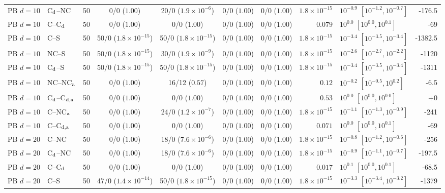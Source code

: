 \begin{tabular}{@{}llr cccc r l r@{}}
PB $d=10$ & C$_{\rm d}$--NC & 50 & 0/0 ($1.00$) & 20/0 ($1.9\times10^{-6}$) & 0/0 ($1.00$) & 0/0 ($1.00$) & $1.8\times10^{-15}$ & $10^{-0.9}$ $[10^{-1.2},10^{-0.7}]$ & -176.5\\
PB $d=10$ & C--C$_{\rm d}$ & 50 & 0/0 ($1.00$) & 0/0 ($1.00$) & 0/0 ($1.00$) & 0/0 ($1.00$) & $0.079$ & $10^{0.0}$ $[10^{0.0},10^{0.1}]$ & -69\\
PB $d=10$ & C--S & 50 & 50/0 ($1.8\times10^{-15}$) & 50/0 ($1.8\times10^{-15}$) & 0/0 ($1.00$) & 0/0 ($1.00$) & $1.8\times10^{-15}$ & $10^{-3.4}$ $[10^{-3.5},10^{-3.4}]$ & -1382.5\\
PB $d=10$ & NC--S & 50 & 50/0 ($1.8\times10^{-15}$) & 30/0 ($1.9\times10^{-9}$) & 0/0 ($1.00$) & 0/0 ($1.00$) & $1.8\times10^{-15}$ & $10^{-2.6}$ $[10^{-2.7},10^{-2.2}]$ & -1120\\
PB $d=10$ & C$_{\rm d}$--S & 50 & 50/0 ($1.8\times10^{-15}$) & 50/0 ($1.8\times10^{-15}$) & 0/0 ($1.00$) & 0/0 ($1.00$) & $1.8\times10^{-15}$ & $10^{-3.4}$ $[10^{-3.5},10^{-3.4}]$ & -1311\\
PB $d=10$ & NC--NC$_{\rm a}$ & 50 & 0/0 ($1.00$) & 16/12 ($0.57$) & 0/0 ($1.00$) & 0/0 ($1.00$) & $0.12$ & $10^{-0.2}$ $[10^{-0.5},10^{0.2}]$ & -6.5\\
PB $d=10$ & C$_{\rm d}$--C$_{\rm d,a}$ & 50 & 0/0 ($1.00$) & 0/0 ($1.00$) & 0/0 ($1.00$) & 0/0 ($1.00$) & $0.53$ & $10^{0.0}$ $[10^{0.0},10^{0.0}]$ & +0\\
PB $d=10$ & C--NC$_{\rm a}$ & 50 & 0/0 ($1.00$) & 24/0 ($1.2\times10^{-7}$) & 0/0 ($1.00$) & 0/0 ($1.00$) & $1.8\times10^{-15}$ & $10^{-1.1}$ $[10^{-1.3},10^{-0.9}]$ & -241\\
PB $d=10$ & C--C$_{\rm d,a}$ & 50 & 0/0 ($1.00$) & 0/0 ($1.00$) & 0/0 ($1.00$) & 0/0 ($1.00$) & $0.071$ & $10^{0.0}$ $[10^{0.0},10^{0.1}]$ & -69\\
PB $d=20$ & C--NC & 50 & 0/0 ($1.00$) & 18/0 ($7.6\times10^{-6}$) & 0/0 ($1.00$) & 0/0 ($1.00$) & $1.8\times10^{-15}$ & $10^{-0.8}$ $[10^{-1.2},10^{-0.6}]$ & -256\\
PB $d=20$ & C$_{\rm d}$--NC & 50 & 0/0 ($1.00$) & 18/0 ($7.6\times10^{-6}$) & 0/0 ($1.00$) & 0/0 ($1.00$) & $1.8\times10^{-15}$ & $10^{-0.9}$ $[10^{-1.1},10^{-0.7}]$ & -197.5\\
PB $d=20$ & C--C$_{\rm d}$ & 50 & 0/0 ($1.00$) & 0/0 ($1.00$) & 0/0 ($1.00$) & 0/0 ($1.00$) & $0.017$ & $10^{0.1}$ $[10^{0.0},10^{0.1}]$ & -68.5\\
PB $d=20$ & C--S & 50 & 47/0 ($1.4\times10^{-14}$) & 50/0 ($1.8\times10^{-15}$) & 0/0 ($1.00$) & 0/0 ($1.00$) & $1.8\times10^{-15}$ & $10^{-3.3}$ $[10^{-3.4},10^{-3.2}]$ & -1379\\

\end{tabular}
